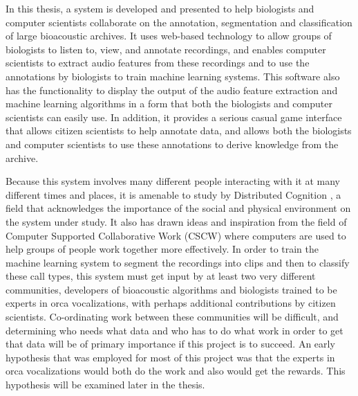 In this thesis, a system is developed and presented to help biologists
and computer scientists collaborate on the annotation, segmentation
and classification of large bioacoustic archives.  It uses web-based
technology to allow groups of biologists to listen to, view, and
annotate recordings, and enables computer scientists to extract audio
features from these recordings and to use the annotations by
biologists to train machine learning systems.  This software also has
the functionality to display the output of the audio feature
extraction and machine learning algorithms in a form that both the
biologists and computer scientists can easily use.  In addition, it
provides a serious casual game interface that allows citizen
scientists to help annotate data, and allows both the biologists and
computer scientists to use these annotations to derive knowledge from
the archive.

Because this system involves many different people interacting with it
at many different times and places, it is amenable to study by
Distributed Cognition \cite{hutchins1996cognition}, a field that
acknowledges the importance of the social and physical environment on
the system under study.  It also has drawn ideas and inspiration from
the field of Computer Supported Collaborative Work (CSCW)
\cite{bannon1991cscw} where computers are used to help groups of
people work together more effectively.  In order to train the machine
learning system to segment the recordings into clips and then to
classify these call types, this system must get input by at least two very
different communities, developers of bioacoustic algorithms and
biologists trained to be experts in orca vocalizations, with perhaps
additional contributions by citizen scientists.  Co-ordinating work
between these communities will be difficult, and determining who needs
what data and who has to do what work in order to get that
data\cite{grudin1988cscw} will be of primary importance if this
project is to succeed.  An early hypothesis that was employed for most
of this project was that the experts in orca vocalizations would both
do the work and also would get the rewards.  This hypothesis will be
examined later in the thesis.

